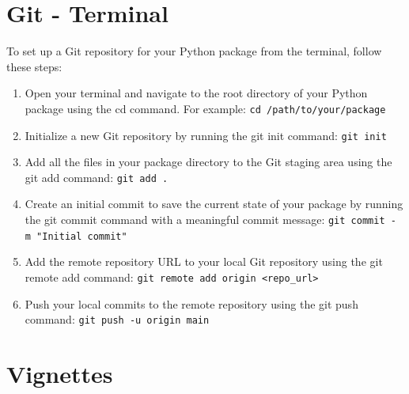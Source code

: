 \documentclass[
  letterpaper,
  DIV=11,
  numbers=noendperiod]{scrreprt}
\begin{document}
\section{Git - Terminal}\label{git---terminal}

To set up a Git repository for your Python package from the terminal,
follow these steps:

\begin{enumerate}
\def\labelenumi{\arabic{enumi}.}
\item
  Open your terminal and navigate to the root directory of your Python
  package using the cd command. For example:
  \texttt{cd\ /path/to/your/package}
\item
  Initialize a new Git repository by running the git init command:
  \texttt{git\ init}
\item
  Add all the files in your package directory to the Git staging area
  using the git add command: \texttt{git\ add\ .}
\item
  Create an initial commit to save the current state of your package by
  running the git commit command with a meaningful commit message:
  \texttt{git\ commit\ -m\ "Initial\ commit"}
\item
  Add the remote repository URL to your local Git repository using the
  git remote add command:
  \texttt{git\ remote\ add\ origin\ \textless{}repo\_url\textgreater{}}
\item
  Push your local commits to the remote repository using the git push
  command: \texttt{git\ push\ -u\ origin\ main}
\end{enumerate}

\section{Vignettes}\label{vignettes}
\end{document}
